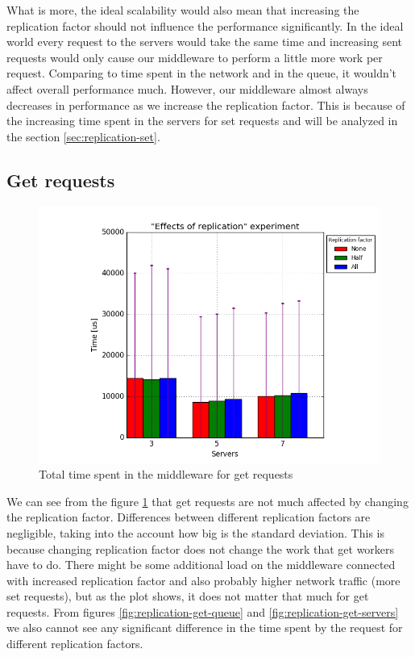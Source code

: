 \documentclass[11pt]{article}
\begin{document}
What is more, the ideal scalability would also mean that increasing the replication factor should not influence the performance significantly. In the ideal world every request to the servers would take the same time and increasing sent requests would only cause our middleware to perform a little more work per request. Comparing to time spent in the network and in the queue, it wouldn't affect overall performance much. However, our middleware almost always decreases in performance as we increase the replication factor. This is because of the increasing time spent in the servers for set requests and will be analyzed in the section \ref{sec:replication-set}.

\subsection{Get requests}
\label{sec:replication-get}

\begin{figure}
\centering
	\includegraphics[width=0.7\linewidth]{plots/replication-get}

\caption{Total time spent in the middleware for get requests}
\label{fig:replication-get}
\end{figure}

We can see from the figure \ref{fig:replication-get} that get requests are not much affected by changing the replication factor. Differences between different replication factors are negligible, taking into the account how big is the standard deviation. This is because changing replication factor does not change the work that get workers have to do. There might be some additional load on the middleware connected with increased replication factor and also probably higher network traffic (more set requests), but as the plot shows, it does not matter that much for get requests. From figures \ref{fig:replication-get-queue} and \ref{fig:replication-get-servers} we also cannot see any significant difference in the time spent by the request for different replication factors.
\end{document}
